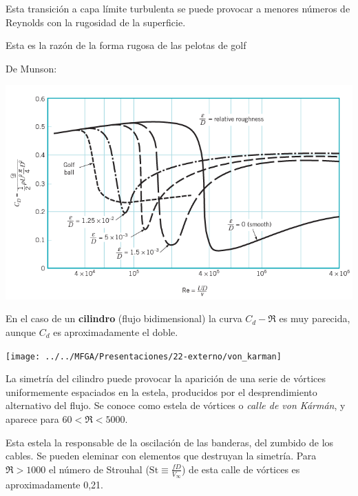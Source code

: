 	
	\begin{minipage}[c]{0.4\textwidth}%
		Esta transición a capa límite turbulenta se puede provocar a menores
		números de Reynolds con la rugosidad de la superficie.
		
		Esta es la razón de la forma rugosa de las pelotas de golf %
	\end{minipage} %
	\begin{minipage}[c]{0.5\textwidth}%
		De Munson\cite{Munson}:
\begin{center}
	\includegraphics[width=\linewidth]{TeX_files/chapter09-Externo/roughSphere.png}
\end{center}
	\end{minipage}
	
	\smallskip{}
	En el caso de un \textbf{cilindro} (flujo bidimensional) la curva
	$C_{d}-\Re$ es muy parecida, aunque $C_{d}$ es aproximadamente el
	doble.\smallskip{}
	
	\begin{minipage}[c]{0.4\textwidth}%
\begin{center}
	\texttt{[image: ../../MFGA/Presentaciones/22-externo/von\_karman]}
\end{center}
	\end{minipage} %
	\begin{minipage}[c]{0.58\textwidth}%
		La simetría del cilindro puede provocar la aparición de una serie
		de vórtices uniformemente espaciados en la estela, producidos por
		el desprendimiento alternativo del flujo. Se conoce como estela de
		vórtices o \textit{calle de von Kármán}, y aparece para $60<\Re<5000$. %
	\end{minipage}

	
	Esta estela la responsable de la oscilación de las banderas, del zumbido
	de los cables. Se pueden eleminar con elementos que destruyan la simetría.
	Para $\Re>1000$ el número de Strouhal ($\textrm{St}\equiv\frac{fD}{V_{\infty}}$)
	de esta calle de vórtices es aproximadamente 0,21. 
	
